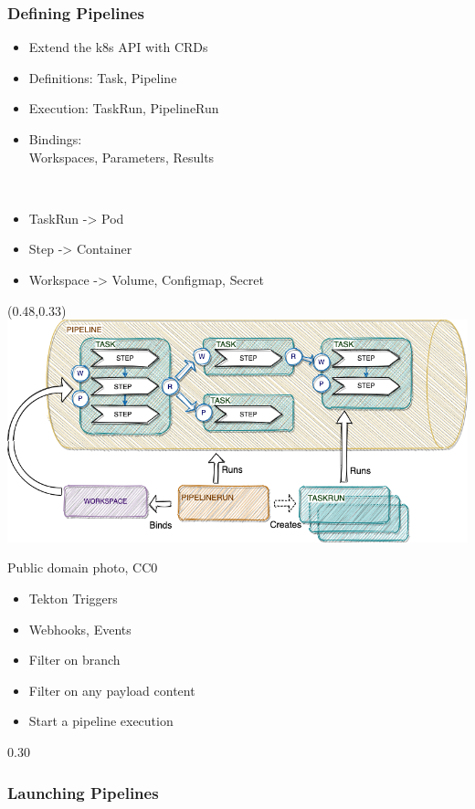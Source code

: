 \documentclass[aspectratio=169,11pt,hyperref={colorlinks=true}]{beamer}
\begin{document}
\begin{lgrayrwhiteframe}
  \frametitle{Defining Pipelines}
  \begin{itemize}
    \item Extend the k8s API with CRDs
    \item Definitions: Task, Pipeline
    \item Execution: TaskRun, PipelineRun
    \item Bindings: \\Workspaces, Parameters, Results
  \end{itemize}
  ~
  \begin{itemize}
    \item TaskRun -> Pod
    \item Step -> Container
    \item Workspace -> Volume, Configmap, Secret
  \end{itemize}
  \begin{textblock*}{0.51\paperwidth}(0.48\paperwidth,0.33\paperheight)
    \includegraphics[width=0.5\paperwidth]{img/tekton-workspaces.png}
  \end{textblock*}
\end{lgrayrwhiteframe}

\begin{lgrayframerpic}{Public domain photo, CC0}%
  {%
  \begin{itemize}
    \item Tekton Triggers
    \item Webhooks, Events
    \item Filter on branch
    \item Filter on any payload content
    \item Start a pipeline execution
  \end{itemize}
  }%
  {0.30}
  \frametitle{Launching Pipelines}
\end{lgrayframerpic}
\end{document}
